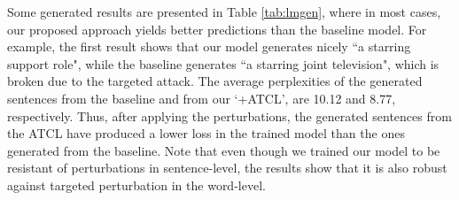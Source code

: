 \documentclass[letterpaper]{article} %
\begin{document}
Some generated results are presented in Table \ref{tab:lmgen}, where in most cases, our proposed approach yields better predictions than the baseline model. For example, the first result shows that our model generates nicely ``a starring support role", while the baseline generates ``a starring joint television", which is broken due to the targeted attack. The average perplexities of the generated sentences from the baseline and from our `+ATCL', are 10.12 and 8.77, respectively. Thus, after applying the perturbations, the generated sentences from the ATCL have produced a lower loss in the trained model than the ones generated from the baseline.
Note that even though we trained our model to be resistant of perturbations in sentence-level, the results show that it is also robust against targeted perturbation in the word-level. 
\end{document}
